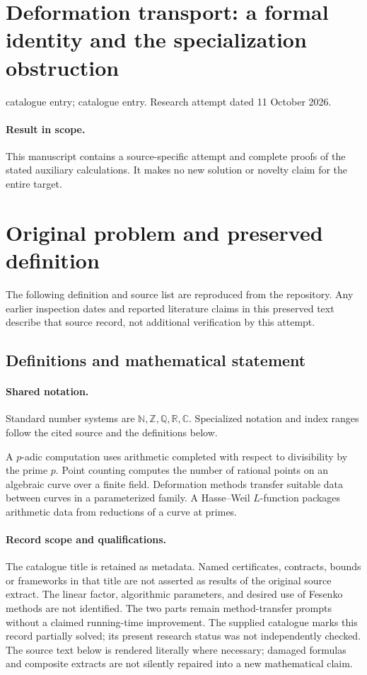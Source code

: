 \documentclass[11pt]{article}
\begin{document}
\section*{Deformation transport: a formal identity and the specialization obstruction}
\noindent catalogue entry; catalogue entry. Research attempt dated 11 October 2026.
\paragraph{Result in scope.}This manuscript contains a source-specific attempt and complete proofs of the stated auxiliary calculations. It makes no new solution or novelty claim for the entire target.
\section{Original problem and preserved definition}
The following definition and source list are reproduced from the repository. Any earlier inspection dates and reported literature claims in this preserved text describe that source record, not additional verification by this attempt.
\subsection{Definitions and mathematical statement}

\paragraph{Shared notation.}Standard number systems are $\mathbb N,\mathbb Z,\mathbb Q,\mathbb R,\mathbb C$. Specialized notation and index ranges follow the cited source and the definitions below.


A $p$-adic computation uses arithmetic completed with respect to divisibility by the prime $p$. Point counting computes the number of rational points on an algebraic curve over a finite field. Deformation methods transfer suitable data between curves in a parameterized family. A Hasse--Weil $L$-function packages arithmetic data from reductions of a curve at primes.
\paragraph{Record scope and qualifications.}
The catalogue title is retained as metadata. Named certificates, contracts, bounds or frameworks in that title are not asserted as results of the original source extract.
The linear factor, algorithmic parameters, and desired use of Fesenko methods are not identified. The two parts remain method-transfer prompts without a claimed running-time improvement. The supplied catalogue marks this record partially solved; its present research status was not independently checked.
The source text below is rendered literally where necessary; damaged formulas and composite extracts are not silently repaired into a new mathematical claim.
\end{document}
